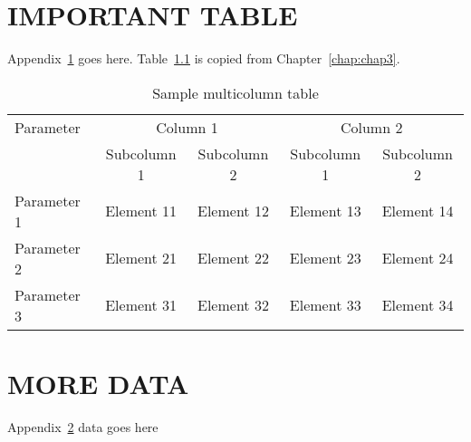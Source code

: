 \chapter{IMPORTANT TABLE}\label{chap:appA}
 Appendix~\ref{chap:appA} goes here.  Table~\ref{tbl:appA:table1} is copied from Chapter~\ref{chap:chap3}.
\begin{table}[h]
\caption{Sample multicolumn table}
\begin{center}
  \begin{tabular}{|l|cc|cc|}
    \hline
  Parameter & \multicolumn{2}{c|}{Column 1} & \multicolumn{2}{c|}{Column 2}\\ \cline{2-5}
              & Subcolumn 1 & Subcolumn 2 & Subcolumn 1 & Subcolumn 2 \\
\hline
    Parameter 1 & Element 11 & Element 12 & Element 13 & Element 14\\
    Parameter 2 & Element 21 & Element 22 & Element 23 & Element 24\\
    Parameter 3 & Element 31 & Element 32 & Element 33 & Element 34\\
    \hline
\end{tabular} \label{tbl:appA:table1}
\end{center}
\end{table}
%
\chapter{MORE DATA}\label{chap:appB}
Appendix~\ref{chap:appB} data goes here
